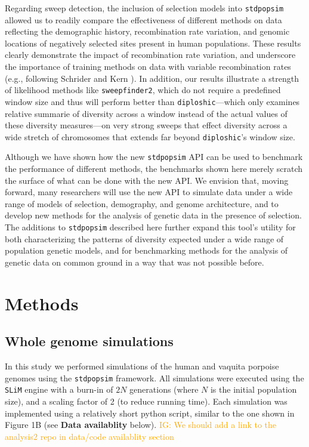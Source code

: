 \documentclass[hidelinks]{article}
\newcommand{\stdpopsim}{\texttt{stdpopsim}\xspace}
\newcommand{\slim}{\texttt{SLiM}\xspace}
\newcommand{\sweepfinder}{\texttt{sweepfinder2}\xspace}
\newcommand{\diploshic}{\texttt{diploshic}\xspace}
\newcommand{\igcomment}[1]{\textcolor{orange}{IG: #1}}
\begin{document}
    Regarding sweep detection, the inclusion of selection models into \stdpopsim allowed us to readily compare the
    effectiveness of different methods on data reflecting the demographic history, recombination rate variation,
    and genomic locations of negatively selected sites present in human populations. These results clearly demonstrate
    the impact of recombination rate variation, and underscore the importance of training methods on data with variable
    recombination rates (e.g., following Schrider and Kern \citeyear{schrider2017soft}). In addition, our results
    illustrate a strength of likelihood methods like \sweepfinder, which do not require a predefined window size and
    thus will perform better than \diploshic---which only examines relative summarie of diversity across a window instead
    of the actual values of these diversity measures---on very strong sweeps that effect diversity across a wide stretch of
    chromosomes that extends far beyond \diploshic's window size. 

    Although we have shown how the new \stdpopsim API can be used to benchmark the performance of different methods,
    the benchmarks shown here merely scratch the surface of what can be done with the new API.
    We envision that, moving forward, many researchers will use
    the new API to simulate data under a wide range of models of selection, demography, and genome architecture, and to develop
    new methods for the analysis of genetic data in the presence of selection. 
    The additions to \stdpopsim described here further expand this tool's utility for both 
    characterizing the patterns of diversity expected under a wide range of population genetic
    models, and for benchmarking methods for the analysis of genetic data
    on common ground in a way that was not possible before.

\section*{Methods}
    \label{methods}

    \subsection*{Whole genome simulations}
    In this study we performed simulations of the human and vaquita porpoise genomes
    using the \stdpopsim{} framework.
    All simulations were executed using the \slim engine with a burn-in of $2N$ generations
    (where $N$ is the initial population size), and a scaling factor of 2 (to reduce running time).
    Each simulation was implemented using a relatively short python script, similar to the one shown in Figure 1B
    (see \textbf{Data availablity} below).
    \igcomment{We should add a link to the analysis2 repo in data/code availablity section}
   
\end{document}
